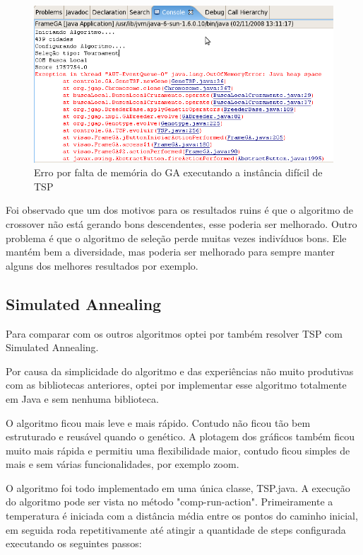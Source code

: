 \documentclass{acm_proc_article-sp}
\begin{document}
\begin{figure}[ht]
 \begin{center}
  \includegraphics[scale=0.35]{imagens/dificil_GA.png} 
  \caption{Erro por falta de memória do GA executando a instância difícil de TSP}
  \label{fig:dificilGA}
 \end{center}
\end{figure}

Foi observado que um dos motivos para os resultados ruins é que o algoritmo de crossover não está gerando bons descendentes, esse poderia ser melhorado. Outro problema é que o algoritmo de seleção perde muitas vezes indivíduos bons. Ele mantém bem a diversidade, mas poderia ser melhorado para sempre manter alguns dos melhores resultados por exemplo.

\subsection{Simulated Annealing}
Para comparar com os outros algoritmos optei por também resolver TSP com Simulated Annealing.

Por causa da simplicidade do algoritmo e das experiências não muito produtivas com as bibliotecas anteriores, optei por implementar esse algoritmo totalmente em Java e sem nenhuma biblioteca.

O algoritmo ficou mais leve e mais rápido. Contudo não ficou tão bem estruturado e reusável quando o genético. A plotagem dos gráficos também ficou muito mais rápida e permitiu uma flexibilidade maior, contudo ficou simples de mais e sem várias funcionalidades, por exemplo zoom.

O algoritmo foi todo implementado em uma única classe, TSP.java. A execução do algoritmo pode ser vista no método "comp-run-action". Primeiramente a temperatura é iniciada com a distância média entre os pontos do caminho inicial, em seguida roda repetitivamente até atingir a quantidade de steps configurada executando os seguintes passos:
\end{document}
